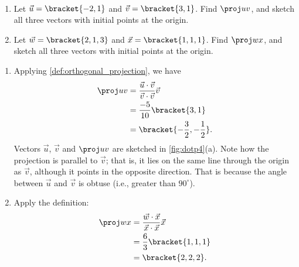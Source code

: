 \begin{example}\label{ex_dotp4}
\mbox{}\\[-2\baselineskip]\parbox[t]{\linewidth}{%
\begin{enumerate}
	\item Let $\vec u=\bracket{-2,1}$ and $\vec v=\bracket{3,1}$. Find $\proj uv$, and sketch all three vectors with initial points at the origin.
	\item	Let $\vec w =\bracket{2,1,3}$ and $\vec x =\bracket{1,1,1}$. Find $\proj wx$, and sketch all three vectors with initial points at the origin.
\end{enumerate}}\vspace{0pt}
\solution
\begin{enumerate}
	\item Applying \autoref{def:orthogonal_projection}, we have
	\begin{align*}
		\proj uv
		&= \frac{\vec u\cdot\vec v}{\vec v\cdot\vec v}\vec v \\
		&= \frac{-5}{10}\bracket{3,1}\\
		&=\bracket{-\frac32,-\frac12}.
	\end{align*}
	Vectors $\vec u$, $\vec v$ and $\proj uv$ are sketched in \autoref{fig:dotp4}(a). Note how the projection is parallel to $\vec v$; that is, it lies on the same line through the origin as $\vec v$, although it points in the opposite direction. That is because the angle between $\vec u$ and $\vec v$ is obtuse (i.e., greater than $90^\circ$).
	
	\item	Apply the definition:
	\begin{align*}
		\proj wx
		&= \frac{\vec w\cdot\vec x}{\vec x\cdot\vec x}\vec x \\
		&= \frac{6}{3}\bracket{1,1,1}\\
		&=\bracket{2,2,2}.
	\end{align*}
	\iftoggle{in_threeD}{%
	 These vectors are sketched in \autoref{fig:dotp4}(b).%
	}{%
	 These vectors are sketched in \autoref{fig:dotp4}(b), and again in part (c) from a different perspective. Because of the nature of graphing these vectors, the sketch in part (b) makes it difficult  to recognize that the drawn projection has the geometric properties it should. The graph shown in part (c) illustrates these properties better.
	}
\end{enumerate}%
\end{example}

